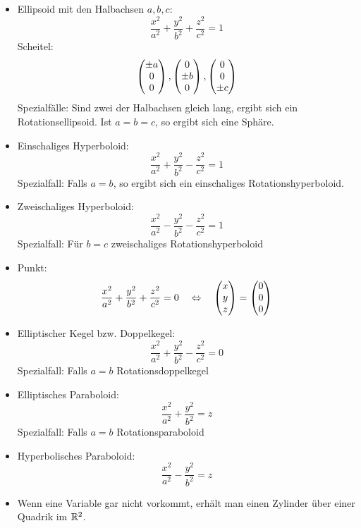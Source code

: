 \documentclass[
 a4paper,
 12pt,
 parskip=half
 ]{scrartcl}
\theoremstyle{plain}
\theoremstyle{definition}
\begin{document}
\begin{itemize}
  \item Ellipsoid mit den Halbachsen $a,b,c$:
    \[ \frac{x^2}{a^2} + \frac{y^2}{b^2} + \frac{z^2}{c^2} = 1 \]
    Scheitel:
    \[ \begin{pmatrix}\pm a\\0\\0\end{pmatrix}, \begin{pmatrix}0\\\pm b\\0\end{pmatrix}, \begin{pmatrix}0\\0\\\pm c\end{pmatrix} \]
    Spezialfälle: Sind zwei der Halbachsen gleich lang, ergibt sich ein
    Rotationsellipsoid. Ist $a=b=c$, so ergibt sich eine Sphäre.
  \item Einschaliges Hyperboloid:
    \[ \frac{x^2}{a^2} + \frac{y^2}{b^2} - \frac{z^2}{c^2} = 1 \]
    Spezialfall: Falls $a=b$, so ergibt sich ein einschaliges
    Rotationshyperboloid.
  \item Zweischaliges Hyperboloid:
    \[ \frac{x^2}{a^2} - \frac{y^2}{b^2} - \frac{z^2}{c^2} = 1 \]
    Spezialfall: Für $b=c$ zweischaliges Rotationshyperboloid
  \item Punkt:
    \[ \frac{x^2}{a^2} + \frac{y^2}{b^2} + \frac{z^2}{c^2} = 0  \quad \Leftrightarrow \quad
      \begin{pmatrix}x\\y\\z\end{pmatrix} = \begin{pmatrix}0\\0\\0\end{pmatrix} \]
  \item Elliptischer Kegel bzw. Doppelkegel:
    \[ \frac{x^2}{a^2} + \frac{y^2}{b^2} - \frac{z^2}{c^2} = 0 \]
    Spezialfall: Falls $a=b$ Rotationsdoppelkegel
  \item Elliptisches Paraboloid:
    \[ \frac{x^2}{a^2} + \frac{y^2}{b^2}  = z \]
    Spezialfall: Falls $a=b$ Rotationsparaboloid
  \item Hyperbolisches Paraboloid:
    \[ \frac{x^2}{a^2} - \frac{y^2}{b^2}  = z \]
  \item Wenn eine Variable gar nicht vorkommt, erhält man einen Zylinder über
    einer Quadrik im $\mathbb{R}^2$.
\end{itemize}
\end{document}
